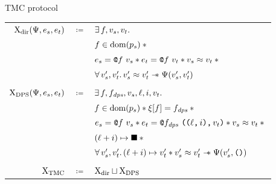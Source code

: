 \begin{frame}{TMC protocol}
\begin{adjustwidth}{-1.5em}{-1.5em}
\begin{tabular}{rcl}
        $\iProt_\mathrm{dir} (\iPredTwo, \datalangExpr_s, \datalangExpr_t)$
        & $\coloneqq$ &
        $\exists \datalangFn, \datalangVal_s, \datalangVal_t \ldotp$
    \\
        &&
        $\datalangFn \in \dom{\datalangProg_s} \iSep {}$
    \\
        &&
        $\datalangExpr_s = \datalangCall{\datalangFnptr{\datalangFn}}{\datalangVal_s} \iSep
        \datalangExpr_t = \datalangCall{\datalangFnptr{\datalangFn}}{\datalangVal_t} \iSep
        \datalangVal_s \iSimilar \datalangVal_t \iSep {}$
    \\
        &&
        $\forall \datalangVal_s', \datalangVal_t' \ldotp
        \datalangVal_s' \iSimilar \datalangVal_t' \iWand
        \iPredTwo (\datalangVal_s', \datalangVal_t')$
    \\\\
        $\iProt_\mathrm{DPS} (\iPredTwo, \datalangExpr_s, \datalangExpr_t)$
        & $\coloneqq$ &
        $\exists \datalangFn, \datalangFn_\mathit{dps}, \datalangVal_s, \datalangLoc, \datalangIdx, \datalangVal_t \ldotp$
    \\
        &&
        $\datalangFn \in \dom{\datalangProg_s} \iSep
        \datalangRenaming [\datalangFn] = \datalangFn_\mathit{dps} \iSep {}$
    \\
        &&
        $\datalangExpr_s = \datalangCall{\datalangFnptr{\datalangFn}}{\datalangVal_s} \iSep
        \datalangExpr_t = \datalangCall{\datalangFnptr{\datalangFn_\mathit{dps}}}{\datalangPair{\datalangPair{\datalangLoc}{\datalangIdx}}{\datalangVal_t}} \iSep
        \datalangVal_s \iSimilar \datalangVal_t \iSep {}$
    \\
        &&
        $(\datalangLoc + \datalangIdx) \iPointsto \datalangHole \iSep {}$
    \\
        &&
        $\forall \datalangVal_s', \datalangVal_t' \ldotp
        (\datalangLoc + \datalangIdx) \iPointsto \datalangVal_t' \iSep
        \datalangVal_s' \iSimilar \datalangVal_t' \iWand
        \iPredTwo (\datalangVal_s', \datalangUnit)$
    \\\\
        $\mathrm{X}_\mathrm{TMC}$
        & $\coloneqq$ &
        $\mathrm{X}_\mathrm{dir} \sqcup \mathrm{X}_\mathrm{DPS}$
\end{tabular}
\end{adjustwidth}
\end{frame}